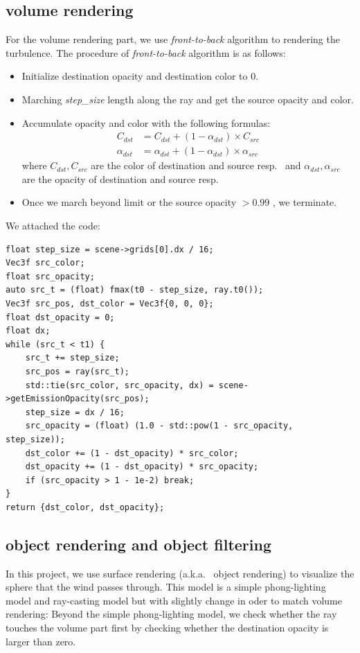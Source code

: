 \documentclass[acmtog]{acmart}
\begin{document}
    \subsection{volume rendering}\label{subsec:volume-rendering}
    For the volume rendering part, we use \emph{front-to-back} algorithm to rendering the turbulence.
    The procedure of \emph{front-to-back} algorithm is as follows:
    \begin{itemize}
        \item Initialize destination opacity and destination color to 0.
        \item Marching \emph{step\_size} length along the ray and get the source opacity and color.
        \item Accumulate opacity and color with the following formulas:
        \begin{align*}
            C_{dst} &= C_{dst} + (1-\alpha_{dst}) \times C_{src}\\
            \alpha_{dst} &= \alpha_{dst} + (1-\alpha_{dst})\times \alpha_{src}
        \end{align*}
        where $C_{dst}, C_{src}$ are the color of destination and source resp.~ and $\alpha_{dst}, \alpha_{src}$ are the opacity of destination and source resp.
        \item Once we march beyond limit or the source opacity $> 0.99$ , we terminate.
    \end{itemize}
    We attached the code:
    \begin{lstlisting}[label={lst:lstlisting2}]
float step_size = scene->grids[0].dx / 16;
Vec3f src_color;
float src_opacity;
auto src_t = (float) fmax(t0 - step_size, ray.t0());
Vec3f src_pos, dst_color = Vec3f{0, 0, 0};
float dst_opacity = 0;
float dx;
while (src_t < t1) {
    src_t += step_size;
    src_pos = ray(src_t);
    std::tie(src_color, src_opacity, dx) = scene->getEmissionOpacity(src_pos);
    step_size = dx / 16;
    src_opacity = (float) (1.0 - std::pow(1 - src_opacity, step_size));
    dst_color += (1 - dst_opacity) * src_color;
    dst_opacity += (1 - dst_opacity) * src_opacity;
    if (src_opacity > 1 - 1e-2) break;
}
return {dst_color, dst_opacity};
    \end{lstlisting}

    \subsection{object rendering and object filtering}\label{subsec:object-rendering-and-object-filtering}
    In this project, we use surface rendering (a.k.a.~ object rendering) to visualize the sphere that the wind passes through.
    This model is a simple phong-lighting model and ray-casting model but with slightly change in oder to match volume rendering:
    Beyond the simple phong-lighting model, we check whether the ray touches the volume part first by checking whether the destination opacity is larger than zero.
\end{document}

